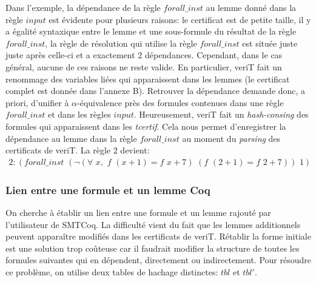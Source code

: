 \documentclass[11pt]{article}
\begin{document}
Dans l'exemple, la dépendance de la règle $forall\_inst$ au lemme donné dans la règle $input$ est évidente pour plusieurs raisons: le certificat est de petite taille, il y a égalité syntaxique entre le lemme et une sous-formule du résultat de la règle $forall\_inst$, la règle de résolution qui utilise la règle $forall\_inst$ est située juste juste après celle-ci et a exactement 2 dépendances. Cependant, dans le cas général, aucune de ces raisons ne reste valide. En particulier, veriT fait un renommage des variables liées qui apparaissent dans les lemmes (le certificat complet est donnée dans l'annexe B). Retrouver la dépendance demande donc, a priori, d'unifier à $\alpha$-équivalence près des formules contenues dans une règle $forall\_inst$ et dans les règles $input$. Heureusement, veriT fait un \textit{hash-consing} des formules qui apparaissent dans les \textit{tcertif}. Cela nous permet d'enregistrer la dépendance au lemme dans la règle $forall\_inst$ au moment du \textit{parsing} des certificats de veriT. La règle $2$ devient: 
\begin{align*}
2:(forall\_inst \,\, (\neg(\forall \,\,x, \,\,f \,\,(x+1) = f\,\,x+7) \,\,(f\,\, (2+1) = f\,\,2+7)) \,\,1) 
\end{align*}

\subsubsection{Lien entre une formule et un lemme Coq} \label{lien_formule_lemme}

On cherche à établir un lien entre une formule et un lemme rajouté par l'utilisateur de SMTCoq. La difficulté vient du fait que les lemmes additionnels peuvent apparaître modifiés dans les certificats de veriT. Rétablir la forme initiale est une solution trop coûteuse car il faudrait modifier la structure de toutes les formules suivantes qui en dépendent, directement ou indirectement. Pour résoudre ce problème, on utilise deux tables de hachage distinctes: $tbl$ et $tbl'$. \\
\end{document}
